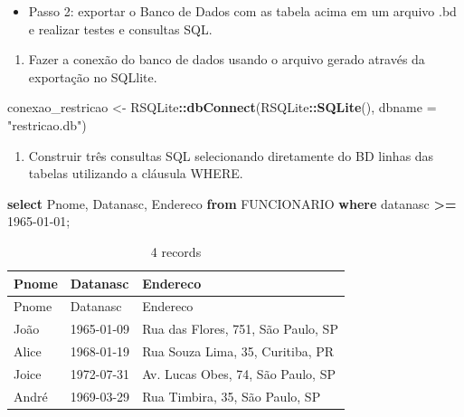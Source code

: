 \documentclass[
]{article}
\newenvironment{Shaded}{\begin{snugshade}}{\end{snugshade}}
\newcommand{\AttributeTok}[1]{\textcolor[rgb]{0.13,0.29,0.53}{#1}}
\newcommand{\FunctionTok}[1]{\textcolor[rgb]{0.13,0.29,0.53}{\textbf{#1}}}
\newcommand{\KeywordTok}[1]{\textcolor[rgb]{0.13,0.29,0.53}{\textbf{#1}}}
\newcommand{\NormalTok}[1]{#1}
\newcommand{\OperatorTok}[1]{\textcolor[rgb]{0.81,0.36,0.00}{\textbf{#1}}}
\newcommand{\OtherTok}[1]{\textcolor[rgb]{0.56,0.35,0.01}{#1}}
\newcommand{\SpecialCharTok}[1]{\textcolor[rgb]{0.81,0.36,0.00}{\textbf{#1}}}
\newcommand{\StringTok}[1]{\textcolor[rgb]{0.31,0.60,0.02}{#1}}
\providecommand{\tightlist}{%
  \setlength{\itemsep}{0pt}\setlength{\parskip}{0pt}}
\begin{document}
\begin{itemize}
\tightlist
\item
  Passo 2: exportar o Banco de Dados com as tabela acima em um arquivo
  .bd e realizar testes e consultas SQL.
\end{itemize}

\begin{enumerate}
\def\labelenumi{\arabic{enumi}.}
\tightlist
\item
  Fazer a conexão do banco de dados usando o arquivo gerado através da
  exportação no SQLlite.
\end{enumerate}

\begin{Shaded}
\begin{Highlighting}[]
\NormalTok{conexao\_restricao }\OtherTok{\textless{}{-}}\NormalTok{ RSQLite}\SpecialCharTok{::}\FunctionTok{dbConnect}\NormalTok{(RSQLite}\SpecialCharTok{::}\FunctionTok{SQLite}\NormalTok{(), }\AttributeTok{dbname =} \StringTok{"restricao.db"}\NormalTok{)}
\end{Highlighting}
\end{Shaded}

\begin{enumerate}
\def\labelenumi{\arabic{enumi}.}
\setcounter{enumi}{1}
\tightlist
\item
  Construir três consultas SQL selecionando diretamente do BD linhas das
  tabelas utilizando a cláusula WHERE.
\end{enumerate}

\begin{Shaded}
\begin{Highlighting}[]
\KeywordTok{select}\NormalTok{ Pnome, Datanasc, Endereco }\KeywordTok{from}\NormalTok{ FUNCIONARIO }\KeywordTok{where}\NormalTok{ datanasc }\OperatorTok{\textgreater{}=} \StringTok{\textquotesingle{}1965{-}01{-}01\textquotesingle{}}\NormalTok{;}
\end{Highlighting}
\end{Shaded}

\begin{longtable}[]{@{}lll@{}}
\caption{4 records}\tabularnewline
\toprule\noalign{}
Pnome & Datanasc & Endereco \\
\midrule\noalign{}
\endfirsthead
\toprule\noalign{}
Pnome & Datanasc & Endereco \\
\midrule\noalign{}
\endhead
\bottomrule\noalign{}
\endlastfoot
João & 1965-01-09 & Rua das Flores, 751, São Paulo, SP \\
Alice & 1968-01-19 & Rua Souza Lima, 35, Curitiba, PR \\
Joice & 1972-07-31 & Av. Lucas Obes, 74, São Paulo, SP \\
André & 1969-03-29 & Rua Timbira, 35, São Paulo, SP \\
\end{longtable}
\end{document}
